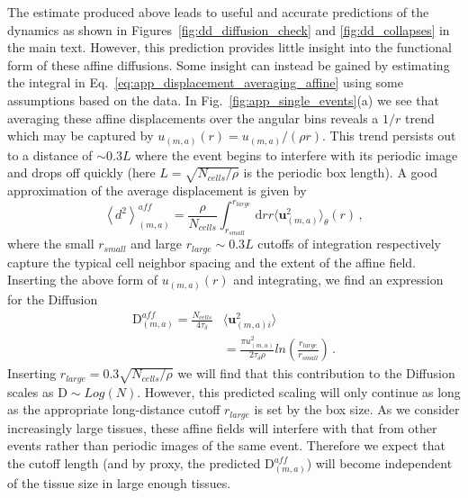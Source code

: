 \documentclass[
reprint
,aps
,amssymb
,amsmath
,superscriptaddress
]{revtex4-1}
\newcommand{\mdc}[1]{{\color{blue}#1}}
\begin{document}
The estimate produced above leads to useful and accurate predictions of the dynamics as shown in Figures~\ref{fig:dd_diffusion_check} and \ref{fig:dd_collapses} in the main text. However, this prediction provides little insight into the functional form of these affine diffusions. Some insight can instead be gained by estimating the integral in Eq.~\ref{eq:app_displacement_averaging_affine} using some assumptions based on the data. In Fig.~\ref{fig:app_single_events}(a) we see that averaging these affine displacements over the angular bins reveals a $1/r$ trend which may be captured by  $ u_{(m,a)}(r) = u_{(m,a)}/(\rho r) $.  This trend persists out to a distance of $\sim 0.3 L$ where the event begins to interfere with its periodic image and drops off quickly (here $L = \sqrt{N_{cells}/\rho}$ is the periodic box length). A good approximation of the average displacement is given by
%
\begin{equation}\label{eq:dd_affine_integral}
\left \langle d^2 \right\rangle^{aff}_{(m,a)} = \frac{\rho}{N_{cells}} \int_{r_{small}}^{r_{large}} \mathrm{d}r r\langle\mathbf{u}_{(m,a)}^2\rangle_{\theta}(r) \, ,
\end{equation}
%
where the small $r_{small}$ and large %
$r_{large} \sim  0.3 L$ cutoffs of integration respectively capture the typical cell neighbor spacing and the extent of the affine field. Inserting the above form of $ u_{(m,a)}(r) $ and integrating, we find an expression for the Diffusion
%
\begin{equation}
\begin{aligned}\label{eq:app_toy_diff_affine}
\mathrm{D}^{aff}_{(m,a)} = \frac{N_{cells}}{4 \tau_\delta} & \langle\mathbf{u}^2_{(m,a)i}\rangle  \\ & = \frac{ \pi u_{(m,a)}^2}{2 \tau_\delta \rho} ln\left(  \frac{r_{large}}{r_{small}} \right) \, .
\end{aligned}
\end{equation}
%
\mdc{Inserting $r_{large} = 0.3 \sqrt{N_{cells}/\rho}$ we will find that this contribution to the Diffusion scales as $\mathrm{D} \sim Log(N)$. However, this predicted scaling will only continue as long as the appropriate long-distance cutoff $r_{large}$ is set by the box size. As we consider increasingly large tissues, these affine fields will interfere with that from other events rather than periodic images of the same event. Therefore we expect that the cutoff length (and by proxy, the predicted $\mathrm{D}^{aff}_{(m,a)}$) will become independent of the tissue size in large enough tissues.}
\end{document}
